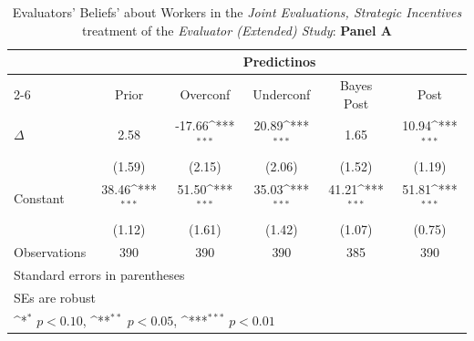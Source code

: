 \begin{table}[htbp]\centering
\def\sym#1{\ifmmode^{#1}\else\(^{#1}\)\fi}
\caption{Evaluators' Beliefs' about Workers in the \textit{Joint Evaluations, Strategic Incentives} treatment of the \textit{Evaluator (Extended) Study}: \textbf{Panel A}}
\begin{tabular}{l*{5}{c}}
\hline\hline
                &\multicolumn{5}{c}{Predictinos}                                                               \\\cmidrule(lr){2-6}
                &\multicolumn{1}{c}{Prior}&\multicolumn{1}{c}{Overconf}&\multicolumn{1}{c}{Underconf}&\multicolumn{1}{c}{Bayes Post}&\multicolumn{1}{c}{Post}\\
\hline
$\Delta$        &     2.58         &   -17.66\sym{***}&    20.89\sym{***}&     1.65         &    10.94\sym{***}\\
                &   (1.59)         &   (2.15)         &   (2.06)         &   (1.52)         &   (1.19)         \\
Constant        &    38.46\sym{***}&    51.50\sym{***}&    35.03\sym{***}&    41.21\sym{***}&    51.81\sym{***}\\
                &   (1.12)         &   (1.61)         &   (1.42)         &   (1.07)         &   (0.75)         \\
\hline
Observations    &      390         &      390         &      390         &      385         &      390         \\
\hline\hline
\multicolumn{6}{l}{\footnotesize Standard errors in parentheses}\\
\multicolumn{6}{l}{\footnotesize SEs are robust}\\
\multicolumn{6}{l}{\footnotesize \sym{*} \(p<0.10\), \sym{**} \(p<0.05\), \sym{***} \(p<0.01\)}\\
\end{tabular}
\end{table}
